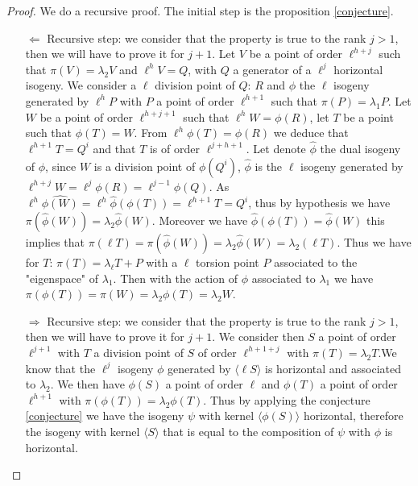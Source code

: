 \documentclass{article}
\theoremstyle{plain}
\theoremstyle{definition}
\theoremstyle{remark}
\begin{document}
\begin{proof}
We do a recursive proof. The initial step is the proposition \ref{conjecture}.
\begin{itemize}
\item[$\Leftarrow$]
Recursive step: we consider that the property is true to the rank $j>1$, then we will have to prove it for $j+1$.
Let $V$ be a point of order $\ell^{h+j}$ such that $\pi(V)=\lambda_2V$ and $\ell^{h}V=Q$, with $Q$ a generator of a $\ell^j$ horizontal isogeny. We consider a $\ell$ division point of $Q$: $R$ and $\phi$ the $\ell$ isogeny generated by $\ell^{h}P$ with $P$ a point of order $\ell^{h+1}$ such that $\pi(P)=\lambda_1P$.
Let $W$ be a point of order $\ell^{h+j+1}$ such that $\ell^hW=\phi(R)$, let $T$ be a point such that $\phi(T)=W$. From $\ell^h\phi(T)=\phi(R)$ we deduce that $\ell^{h+1}T=Q^i$ and that $T$ is of order $\ell^{j+h+1}$. Let denote $\widehat{\phi}$ the dual isogeny of $\phi$, since $W$ is a division point of $\phi(Q^i)$, $\widehat{\phi}$ is the $\ell$ isogeny generated by $\ell^{h+j}W=\ell^j\phi(R)=\ell^{j-1}\phi(Q)$. As $\ell^{h}\widehat{\phi(W)}=\ell^h\widehat{\phi}(\phi(T))=\ell^{h+1}T=Q^i$, thus by hypothesis we have $\pi(\widehat{\phi}(W))=\lambda_2\widehat{\phi}(W)$. Moreover we have $\widehat{\phi} (\phi(T))=\widehat{\phi}(W)$ this implies that $\pi(\ell T)=\pi(\widehat{\phi}(W))=\lambda_2\widehat{\phi}(W)=\lambda_2(\ell T)$. Thus we have for $T$: $\pi(T)=\lambda_\ell T + P$ with a $\ell$ torsion point $P$ associated to the "eigenspace" of $\lambda_1$. Then with the action of $\phi$ associated to $\lambda_1$ we have $\pi(\phi(T))=\pi(W)=\lambda_2\phi(T)=\lambda_2W$. 
\item[$\Rightarrow$]
Recursive step: we consider that the property is true to the rank $j>1$, then we will have to prove it for $j+1$.
We consider then $S$ a point of order $\ell^{j+1}$ with $T$ a division point of $S$ of order $\ell^{h+1+j}$ with $\pi(T)=\lambda_2T$.We know that the $\ell^j$ isogeny $\phi$ generated by $\langle \ell S \rangle$ is horizontal and associated to $\lambda_2$. We then have $\phi(S)$ a point of order $\ell$ and $\phi(T)$ a point of order $\ell^{h+1}$ with $\pi(\phi(T))=\lambda_2\phi(T)$. Thus by applying the conjecture \ref{conjecture} we have the isogeny $\psi$ with kernel $\langle \phi(S) \rangle$ horizontal, therefore the isogeny with kernel $\langle S \rangle$ that is equal to the composition of $\psi$ with $\phi$ is horizontal.
\end{itemize}
\end{proof}
\end{document}
